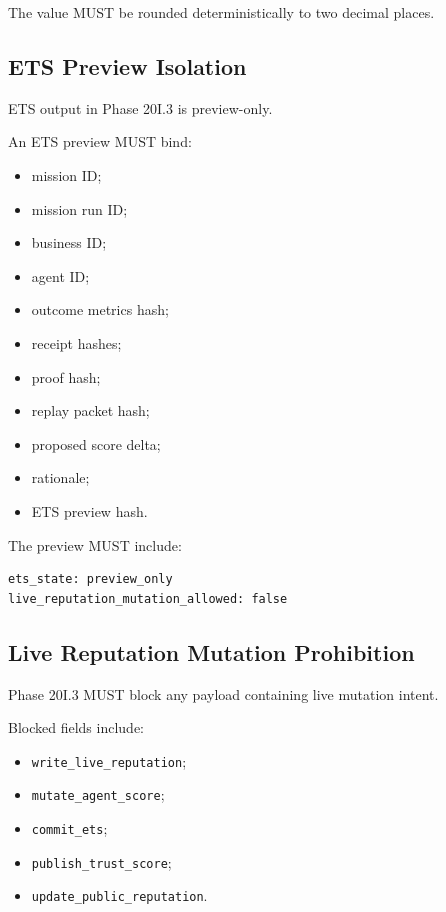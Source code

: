 The value MUST be rounded deterministically to two decimal places.

\subsection{ETS Preview Isolation}

ETS output in Phase 20I.3 is preview-only.

An ETS preview MUST bind:

\begin{itemize}
  \item mission ID;
  \item mission run ID;
  \item business ID;
  \item agent ID;
  \item outcome metrics hash;
  \item receipt hashes;
  \item proof hash;
  \item replay packet hash;
  \item proposed score delta;
  \item rationale;
  \item ETS preview hash.
\end{itemize}

The preview MUST include:

\begin{verbatim}
ets_state: preview_only
live_reputation_mutation_allowed: false
\end{verbatim}

\subsection{Live Reputation Mutation Prohibition}

Phase 20I.3 MUST block any payload containing live mutation intent.

Blocked fields include:

\begin{itemize}
  \item \texttt{write\_live\_reputation};
  \item \texttt{mutate\_agent\_score};
  \item \texttt{commit\_ets};
  \item \texttt{publish\_trust\_score};
  \item \texttt{update\_public\_reputation}.
\end{itemize}

